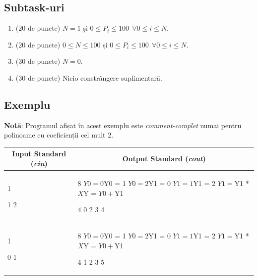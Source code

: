 \documentclass[12pt,a4paper]{article}
\begin{document}
\subsection*{Subtask-uri}

\begin{enumerate}
    \item ($20$ de puncte) $N = 1$ și $0 \leq P_i \leq 100 \ \ \forall 0 \leq i \leq N$.
    \item ($20$ de puncte) $0 \leq N \leq 100$ și $0 \leq P_i \leq 100 \ \ \forall 0 \leq i \leq N$.
    \item ($30$ de puncte) $N = 0$.
    \item ($30$ de puncte) Nicio constrângere suplimentară.
\end{enumerate}



\subsection*{Exemplu}

\textbf{Notă}: Programul afișat în acest exemplu este \textit{comment-complet} numai pentru polinoame cu coeficienții cel mult $2$.

\begin{tabular}{|@{}p{}@{}|@{}p{}@{}|}
\hline
\multicolumn{1}{|c|}{\bfseries Input Standard (\textit{cin})} &
\multicolumn{1}{c|}{\bfseries Output Standard (\textit{cout})} \\
\hline
\begin{textQuoteCell}
1








1 2
\end{textQuoteCell} &
\begin{textQuoteCell}

8
$Y0 = 0
$Y0 = 1
$Y0 = 2
$Y1 = 0
$Y1 = 1
$Y1 = 2
$Y1 = $Y1 * $X
$Y = $Y0 + $Y1

4
0 2 3 4
\end{textQuoteCell} \\    
\hline
\begin{textQuoteCell}
1








0 1
\end{textQuoteCell} &
\begin{textQuoteCell}

8
$Y0 = 0
$Y0 = 1
$Y0 = 2
$Y1 = 0
$Y1 = 1
$Y1 = 2
$Y1 = $Y1 * $X
$Y = $Y0 + $Y1

4
1 2 3 5
\end{textQuoteCell} \\    
\hline
\end{tabular}
\end{document}
